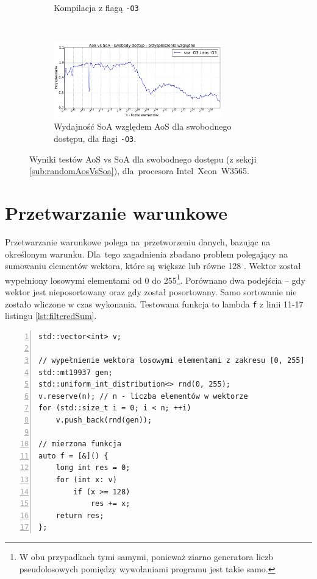 \begin{figure}[!h]
\begin{subfigure}[c]{0.45\textwidth}
        \caption{Kompilacja z flagą \texttt{-O3}}
    \end{subfigure}
    \\
    \vspace{0.55cm}
    \begin{subfigure}[c]{1.0\textwidth}
        \centering
        \includegraphics[width=0.80\textwidth]{images/benchs_xeon/random_access_aos_vs_soa_normalized}
        \caption{Wydajność SoA względem AoS dla swobodnego dostępu, dla flagi \texttt{-O3}.}
        \label{fig:randomAosVsSoaRelativeXeon}
    \end{subfigure}
    \caption{Wyniki testów AoS vs SoA dla swobodnego dostępu (z sekcji \ref{sub:randomAosVsSoa}), dla~procesora \mbox{Intel Xeon W3565}.}
    \label{fig:randomAosVsSoaXeon}
\end{figure}

\clearpage %

\section{Przetwarzanie warunkowe}
\label{sub:filteredSum}

Przetwarzanie warunkowe polega na~przetworzeniu danych, bazując na określonym warunku. Dla~tego zagadnienia zbadano problem polegający na sumowaniu elementów wektora, które są większe lub równe 128 \cite{MindTheCache_FilteredSum}. Wektor został wypełniony losowymi elementami od 0 do 255\footnote{W obu przypadkach tymi samymi, ponieważ ziarno generatora liczb pseudolosowych pomiędzy wywołaniami programu jest takie samo.}. Porównano dwa podejścia -- gdy wektor jest nieposortowany oraz gdy został posortowany. Samo sortowanie nie zostało wliczone w czas wykonania. Testowana funkcja to lambda \texttt{f} z linii 11-17 listingu \ref{lst:filteredSum}.

\begin{lstlisting}[float=!ht, caption={Kod sumowania elementów większych niż 128.}, label=lst:filteredSum,
numbers=left,
stepnumber=1,    
firstnumber=1,
numberfirstline=true]
std::vector<int> v;

// wypełnienie wektora losowymi elementami z zakresu [0, 255]
std::mt19937 gen;
std::uniform_int_distribution<> rnd(0, 255);
v.reserve(n); // n - liczba elementów w wektorze
for (std::size_t i = 0; i < n; ++i)
    v.push_back(rnd(gen));

// mierzona funkcja
auto f = [&]() {
    long int res = 0;
    for (int x: v)
        if (x >= 128)
            res += x;
    return res;
};
\end{lstlisting}

